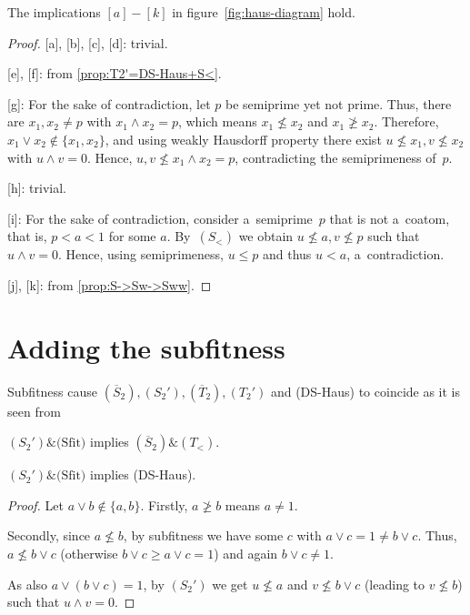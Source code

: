 \begin{prop}
  The implications $[a]-[k]$ in figure~\ref{fig:haus-diagram} hold.
\end{prop}
\begin{proof}

  [a], [b], [c], [d]:
  trivial.

  [e], [f]:
  from \ref{prop:T2'=DS-Haus+S<}.

  [g]:
  For the sake of contradiction, let $p$ be semiprime yet not prime.
  Thus, there are $x_1, x_2 \ne p$ with $x_1 \wedge x_2 = p$, which means
  $x_1\not\le x_2$ and $x_1\not\ge x_2$.
  Therefore, $x_1 \vee x_2 \not\in \{ x_1, x_2 \}$, and using weakly Hausdorff
  property there exist $u\not\le x_1, v\not\le x_2$ with $u \wedge v = 0$.
  Hence, $u, v\not\le x_1 \wedge x_2 = p$, contradicting the semiprimeness
  of~$p$.

  [h]:
  trivial.

  [i]:
  For the sake of contradiction, consider a~semiprime~$p$ that is not a~coatom,
  that is, $p < a < 1$ for some $a$.
  By~$(S_<)$ we obtain $u\not\le a, v\not\le p$ such that $u \wedge v = 0$.
  Hence, using semiprimeness, $u \le p$ and thus $u < a$, a~contradiction.

  [j], [k]:
  from \ref{prop:S->Sw->Sww}.
\end{proof}

\section{Adding the subfitness}

Subfitness cause $(\overline{S}_2), (S_2'), (\overline{T}_2), (T_2')$ and
(DS-Haus) to coincide as it is seen from

\begin{thm} \label{thm:what-does-sfit-do}
  $(S_2')\&\text{(Sfit)}$ implies $(\overline{S}_2)\&(T_<)$.
\end{thm}

\begin{lem} \label{lem:S2'+Sfit->DSHaus}
  $(S_2')\&\text{(Sfit)}$ implies (DS-Haus).
\end{lem}
\begin{proof}
  Let $a \vee b\not\in \{ a, b \}$.
  Firstly, $a\not\ge b$ means $a \ne 1$.

  Secondly, since $a\not\le b$, by subfitness we have some $c$ with $a \vee c =
  1 \ne b \vee c$.
  Thus, $a\not\le b \vee c$ (otherwise $b \vee c \ge a \vee c = 1$) and again
  $b \vee c \ne 1$.

  As also $a \vee (b \vee c) = 1$, by $(S_2')$ we get $u\not\le a$ and
  $v\not\le b \vee c$ (leading to $v\not\le b$) such that $u \wedge v = 0$.
\end{proof}

